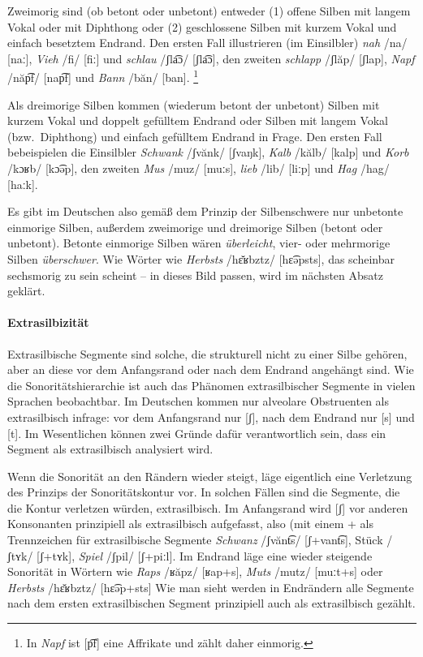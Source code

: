 Zweimorig sind (ob betont oder unbetont) entweder (1) offene Silben mit langem Vokal oder mit Diphthong oder (2) geschlossene Silben mit kurzem Vokal und einfach besetztem Endrand.
Den ersten Fall illustrieren (im Einsilbler) \textit{nah} /na/ [naː], \textit{Vieh} /fi/ [fiː] und \textit{schlau} /ʃla͡ɔ/ [ʃla͡ɔ], den zweiten \textit{schlapp} /ʃlăp/ [ʃlap], \textit{Napf} /năp͡f/ [nap͡f] und \textit{Bann} /băn/ [ban].%
\footnote{In \textit{Napf} ist [p͡f] eine Affrikate und zählt daher einmorig.}

Als dreimorige Silben kommen (wiederum betont der unbetont) Silben mit kurzem Vokal und doppelt gefülltem Endrand oder Silben mit langem Vokal (bzw.\ Diphthong) und einfach gefülltem Endrand in Frage.
Den ersten Fall bebeispielen die Einsilbler \textit{Schwank} /ʃvănk/ [ʃvaŋk], \textit{Kalb} /kălb/ [kalp] und \textit{Korb} /kɔʁb/ [kɔ͡əp], den zweiten \textit{Mus} /muz/ [muːs], \textit{lieb} /lib/ [liːp] und \textit{Hag} /hag/ [haːk].

Es gibt im Deutschen also gemäß dem Prinzip der Silbenschwere nur unbetonte einmorige Silben, außerdem zweimorige und dreimorige Silben (betont oder unbetont).
Betonte einmorige Silben wären \textit{überleicht}, vier- oder mehrmorige Silben \textit{überschwer}.
Wie Wörter wie \textit{Herbsts} /hɛ̆ʁbztz/ [hɛ͡əpsts], das scheinbar sechsmorig zu sein scheint -- in dieses Bild passen, wird im nächsten Absatz geklärt.

\paragraph*{Extrasilbizität}

Extrasilbische Segmente sind solche, die strukturell nicht zu einer Silbe gehören, aber an diese vor dem Anfangsrand oder nach dem Endrand angehängt sind.
Wie die Sonoritätshierarchie ist auch das Phänomen extrasilbischer Segmente in vielen Sprachen beobachtbar.
Im Deutschen kommen nur alveolare Obstruenten als extrasilbisch infrage:
vor dem Anfangsrand nur [ʃ], nach dem Endrand nur [s] und [t].
Im Wesentlichen können zwei Gründe dafür verantwortlich sein, dass ein Segment als extrasilbisch analysiert wird.

Wenn die Sonorität an den Rändern wieder steigt, läge eigentlich eine Verletzung des Prinzips der Sonoritätskontur vor.
In solchen Fällen sind die Segmente, die die Kontur verletzen würden, extrasilbisch.
Im Anfangsrand wird [ʃ] vor anderen Konsonanten prinzipiell als extrasilbisch aufgefasst, also (mit einem + als Trennzeichen für extrasilbische Segmente \textit{Schwanz} /ʃvănt͡s/ [ʃ+vant͡s], Stück /ʃtʏk/ [ʃ+tʏk], \textit{Spiel} /ʃpil/ [ʃ+piːl].
Im Endrand läge eine wieder steigende Sonorität in Wörtern wie \textit{Raps} /ʁăpz/ [ʁap+s], \textit{Muts} /mutz/ [muːt+s] oder \textit{Herbsts} /hɛ̆ʁbztz/ [hɛ͡əp+sts]
Wie man sieht werden in Endrändern alle Segmente nach dem ersten extrasilbischen Segment prinzipiell auch als extrasilbisch gezählt.

